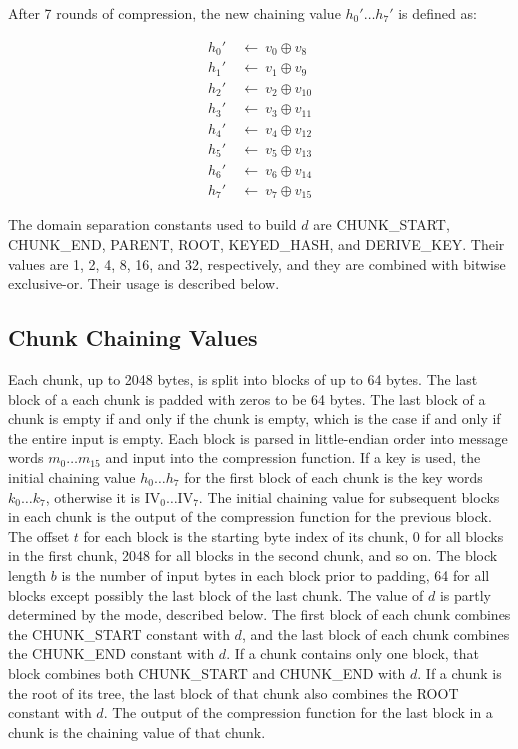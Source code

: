 \documentclass[11pt,notitlepage,a4paper]{article}
\newcommand{\IV}{\text{IV}}
\begin{document}
After 7 rounds of compression, the new chaining value $h_{0}' \ldots h_{7}'$ is
defined as:

\begin{align*}
    h_{0}' \ & \leftarrow \ v_{0} \oplus  v_{8} \\
    h_{1}' \ & \leftarrow \ v_{1} \oplus  v_{9} \\
    h_{2}' \ & \leftarrow \ v_{2} \oplus  v_{10} \\
    h_{3}' \ & \leftarrow \ v_{3} \oplus  v_{11} \\
    h_{4}' \ & \leftarrow \ v_{4} \oplus  v_{12} \\
    h_{5}' \ & \leftarrow \ v_{5} \oplus  v_{13} \\
    h_{6}' \ & \leftarrow \ v_{6} \oplus  v_{14} \\
    h_{7}' \ & \leftarrow \ v_{7} \oplus  v_{15}
\end{align*}

The domain separation constants used to build $d$ are CHUNK\_START, CHUNK\_END,
PARENT, ROOT, KEYED\_HASH, and DERIVE\_KEY. Their values are 1, 2, 4, 8, 16,
and 32, respectively, and they are combined with bitwise exclusive-or. Their
usage is described below.

\subsection{Chunk Chaining Values}\label{sec:chunk}

Each chunk, up to 2048 bytes, is split into blocks of up to 64 bytes. The last
block of a each chunk is padded with zeros to be 64 bytes. The last block of a
chunk is empty if and only if the chunk is empty, which is the case if and only
if the entire input is empty. Each block is parsed in little-endian order into
message words $m_{0} \ldots m_{15}$ and input into the compression function. If
a key is used, the initial chaining value $h_{0} \ldots h_{7}$ for the first
block of each chunk is the key words $k_{0} \ldots k_{7}$, otherwise it is
$\IV_{0} \ldots \IV_{7}$. The initial chaining value for subsequent blocks in
each chunk is the output of the compression function for the previous block.
The offset $t$ for each block is the starting byte index of its chunk, 0 for
all blocks in the first chunk, 2048 for all blocks in the second chunk, and so
on. The block length $b$ is the number of input bytes in each block prior to
padding, 64 for all blocks except possibly the last block of the last chunk.
The value of $d$ is partly determined by the mode, described below. The first
block of each chunk combines the CHUNK\_START constant with $d$, and the last
block of each chunk combines the CHUNK\_END constant with $d$. If a chunk
contains only one block, that block combines both CHUNK\_START and CHUNK\_END
with $d$. If a chunk is the root of its tree, the last block of that chunk also
combines the ROOT constant with $d$. The output of the compression function for
the last block in a chunk is the chaining value of that chunk.
\end{document}
